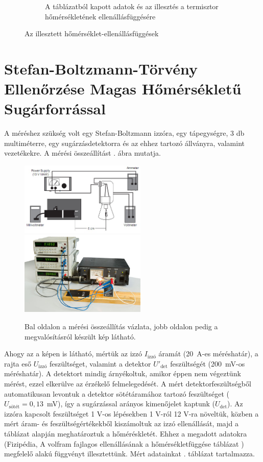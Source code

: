 \documentclass[a4paper, 12pt]{article}
\begin{document}
\begin{figure}[H]
\begin{subfigure}[b]{0.49\textwidth}
            \caption{A táblázatból kapott adatok és az illesztés a termisztor hőmérsékletének ellenállásfüggésére}
            \label{fig:1term}
        \end{subfigure}
        \caption{Az illesztett hőmérséklet-ellenállásfüggések}
        \label{fig:1ill}
    \end{figure}

    \section[Magas Hőmérsékletű Sugárforrás]{Stefan-Boltzmann-Törvény Ellenőrzése Magas Hőmérsékletű Sugárforrással}
    A méréshez szükség volt egy Stefan-Boltzmann izzóra, egy tápegységre, 3 db multiméterre, egy sugárzásdetektorra és az ehhez tartozó állványra, valamint vezetékekre.
    A mérési összeállítást . ábra mutatja.
    \begin{figure}
        \label{fig:2fel}
        \centering
        \includegraphics[width=6cm]{Mérési_elrendezés_1_homsug}
        \includegraphics[width=6cm]{Homsug8.jpg}
        \caption{Bal oldalon a mérési összeállítás vázlata, jobb oldalon pedig a megvalósításról készült kép látható.}
    \end{figure}
    \par
    Ahogy az a képen is látható, mértük az izzó $I_{\mathrm{izzó}}$ áramát (20~A-es méréshatár), a rajta eső $U_{\mathrm{izzó}}$
    feszültséget, valamint a detektor $U'_{\mathrm{det}}$ feszültségét (200~mV-os méréshatár). A detektort mindig árnyékoltuk, amikor éppen nem végeztünk mérést,
    ezzel elkerülve az érzékelő felmelegedését. A mért detektorfeszültségből automatikusan levontuk a detektor sötétáramához tartozó feszültséget ($U_{\mathrm{sötét}}=0,13$~mV),
    így a sugárzással arányos kimenőjelet kaptunk ($U_{\mathrm{det}}$).
    Az izzóra kapcsolt feszültséget 1 V-os lépésekben 1 V-ról 12 V-ra növeltük, közben a mért áram- és feszültségértékekből kiszámoltuk az izzó ellenállását,
    majd a táblázat alapján meghatároztuk a hőméréskletét. Ehhez a megadott adatokra (Fizipédia, A volfram fajlagos ellenállásának a hőmérsékletfüggése táblázat \cite{leir})
    megfelelő alakú függvényt illesztettünk.
    Mért adatainkat . táblázat tartalmazza.
\end{document}
